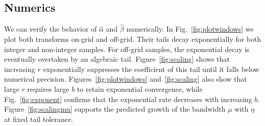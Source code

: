 \documentclass[aps,floatfix,10pt,amssymb,amsfont,amsmath,superscriptaddress,float,nofootinbib,longbibliography,nobalancelastpage,twocolumn]{revtex4-2}
\begin{document}
\subsection{Numerics}
\label{section:numerics}
We can verify the behavior of $\hat \alpha$ and $\hat \beta$ numerically. In Fig.~\ref{fig:plotwindows} we plot both transforms on-grid and off-grid. Their tails decay exponentially for both integer and non-integer samples. For off-grid samples, the exponential decay is eventually overtaken by an algebraic tail. Figure~\ref{fig:scaling} shows that increasing $r$ exponentially suppresses the coefficient of this tail until it falls below numerical precision. Figures~\ref{fig:plotwindows} and~\ref{fig:scaling} also show that large $r$ requires large $b$ to retain exponential convergence, while Fig.~\ref{fig:exponent} confirms that the exponential rate decreases with increasing $b$. Figure~\ref{fig:scalingmu} supports the predicted growth of the bandwidth $\mu$ with $\eta$ at fixed tail tolerance. 
\end{document}

